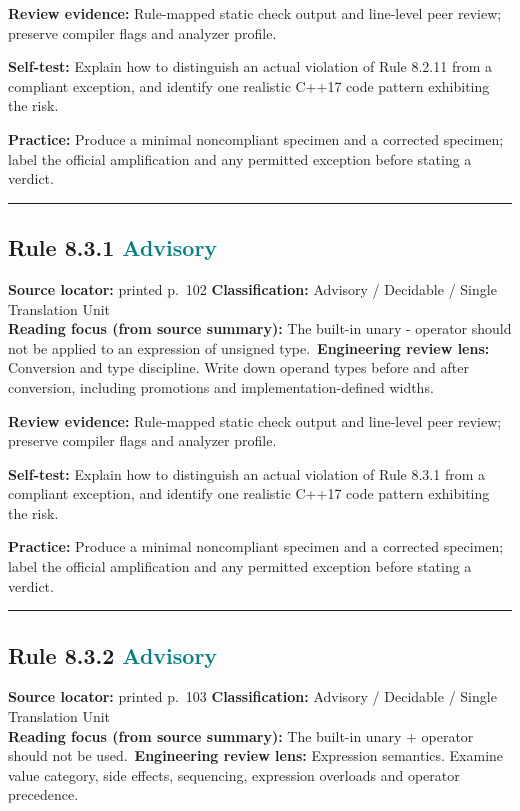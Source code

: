 \documentclass[10pt,letterpaper]{article}
\begin{document}
\textbf{Review evidence:} Rule-mapped static check output and line-level peer review; preserve compiler flags and analyzer profile.

\textbf{Self-test:} Explain how to distinguish an actual violation of Rule 8.2.11 from a compliant exception, and identify one realistic C++17 code pattern exhibiting the risk.\par
\textbf{Practice:} Produce a minimal noncompliant specimen and a corrected specimen; label the official amplification and any permitted exception before stating a verdict.
\smallskip\hrule\smallskip
\subsection*{Rule 8.3.1 \enspace \texorpdfstring{\small\textcolor{teal}{Advisory}}{Advisory}}
\noindent\textbf{Source locator:} printed p.~102 \quad\textbf{Classification:} Advisory / Decidable / Single Translation Unit\\
\textbf{Reading focus (from source summary):} The built-in unary - operator should not be applied to an expression of unsigned type.\
\textbf{Engineering review lens:} Conversion and type discipline. Write down operand types before and after conversion, including promotions and implementation-defined widths.

\textbf{Review evidence:} Rule-mapped static check output and line-level peer review; preserve compiler flags and analyzer profile.

\textbf{Self-test:} Explain how to distinguish an actual violation of Rule 8.3.1 from a compliant exception, and identify one realistic C++17 code pattern exhibiting the risk.\par
\textbf{Practice:} Produce a minimal noncompliant specimen and a corrected specimen; label the official amplification and any permitted exception before stating a verdict.
\smallskip\hrule\smallskip
\subsection*{Rule 8.3.2 \enspace \texorpdfstring{\small\textcolor{teal}{Advisory}}{Advisory}}
\noindent\textbf{Source locator:} printed p.~103 \quad\textbf{Classification:} Advisory / Decidable / Single Translation Unit\\
\textbf{Reading focus (from source summary):} The built-in unary + operator should not be used.\
\textbf{Engineering review lens:} Expression semantics. Examine value category, side effects, sequencing, expression overloads and operator precedence.
\end{document}
